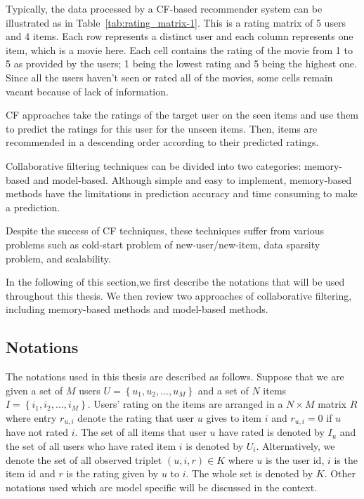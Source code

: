 \documentclass[oneside,13pt]{extreport}
\begin{document}
Typically, the data processed by a CF-based recommender system can be illustrated as in Table~\ref{tab:rating_matrix-1}. This is a rating matrix of 5 users and 4 items. Each row represents a distinct user and each column represents one item, which is a movie here. Each cell contains the rating of the movie from 1 to 5 as provided by the users; 1 being the lowest rating and 5 being the highest one. Since all the users haven't seen or rated all of the movies, some cells remain vacant because of lack of information. 

CF approaches take the ratings of the target user on the seen items and use them to predict the ratings for this user for the unseen items. Then, items are recommended in a descending order according to their predicted ratings.

Collaborative filtering techniques can be divided into two categories: memory-based and model-based. Although simple and easy to implement, memory-based methods have the limitations in prediction accuracy and time consuming to make a prediction. 

Despite the success of CF techniques, these techniques suffer from various problems such as cold-start problem of new-user/new-item, data sparsity problem, and scalability.

In the following of this section,we first describe the notations that will be used throughout this thesis. We then review two approaches
of collaborative filtering, including memory-based methods and model-based methods.

\subsection{Notations}
The notations used in this thesis are described as follows. Suppose that we are given
a set of $M$ users $U = \left\{ {{u_1},{u_2},...,{u_M}} \right\}$ and a set of $N$ items $I = \left\{ {{i_1},{i_2},...,{i_M}} \right\}$. Users’ rating on the items are arranged in a $N \times M$ matrix $R$ where entry $r_{u,i}$ denote the rating that user $u$ gives to item
$i$ and $r_{u,i} = 0$ if $u$ have not rated $i$. The set of all items that user $u$
have rated is denoted by $I_u$ and the set of all users who have rated item $i$ is denoted by $U_i$. Alternatively, we denote the set of all observed
triplet $\left( {u,i,r} \right) \in K$  where $u$ is the user id, $i$ is the item id
and $r$ is the rating given by $u$ to $i$. The whole set is denoted by $K$.
Other notations used which are model specific will be discussed in the context. 
\end{document}
